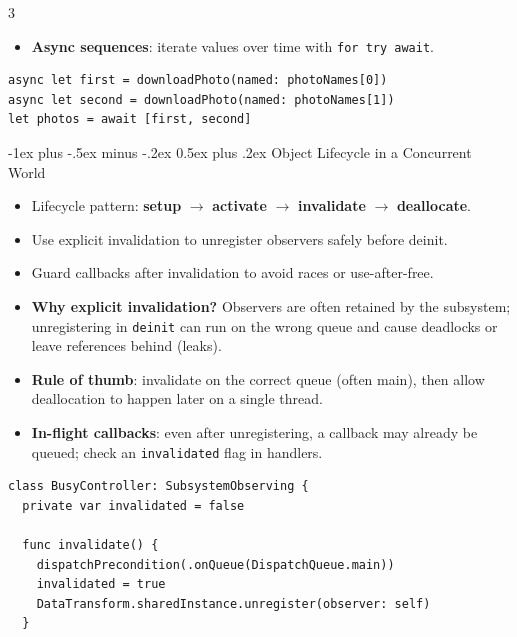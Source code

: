 \documentclass[a4paper, 9pt, landscape]{extarticle}
\makeatletter
\renewcommand{\subsection}{\@startsection{subsubsection}{3}{0mm}%
                                {-1ex plus -.5ex minus -.2ex}%
                                {0.5ex plus .2ex}%
                                {\normalfont\small\bfseries}}
\makeatother
\begin{document}
\begin{multicols*}{3}
\begin{itemize}
\begin{verbatim}
    init(label: String, measurement: Int) {
      self.label = label
      self.measurements = [measurement]
      self.max = measurement }
  }

  let logger = TemperatureLogger(label: "Outdoors", measurement: 25)
  print(await logger.max) // access may suspend execution
  \end{verbatim}
  \item \textbf{Async sequences}: iterate values over time with \texttt{for try await}.
\end{itemize}
\begin{verbatim}
async let first = downloadPhoto(named: photoNames[0])
async let second = downloadPhoto(named: photoNames[1])
let photos = await [first, second]
\end{verbatim}

\subsection{Object Lifecycle in a Concurrent World}
\begin{itemize}
  \item Lifecycle pattern: \textbf{setup} $\rightarrow$ \textbf{activate} $\rightarrow$ \textbf{invalidate} $\rightarrow$ \textbf{deallocate}.
  \item Use explicit invalidation to unregister observers safely before deinit.
  \item Guard callbacks after invalidation to avoid races or use-after-free.
  \item \textbf{Why explicit invalidation?} Observers are often retained by the subsystem; unregistering in \texttt{deinit} can run on the wrong queue and cause deadlocks or leave references behind (leaks).
  \item \textbf{Rule of thumb}: invalidate on the correct queue (often main), then allow deallocation to happen later on a single thread.
  \item \textbf{In-flight callbacks}: even after unregistering, a callback may already be queued; check an \texttt{invalidated} flag in handlers.
\end{itemize}

\begin{verbatim}
class BusyController: SubsystemObserving {
  private var invalidated = false

  func invalidate() {
    dispatchPrecondition(.onQueue(DispatchQueue.main))
    invalidated = true
    DataTransform.sharedInstance.unregister(observer: self)
  }


\end{verbatim}
\end{multicols*}
\end{document}
